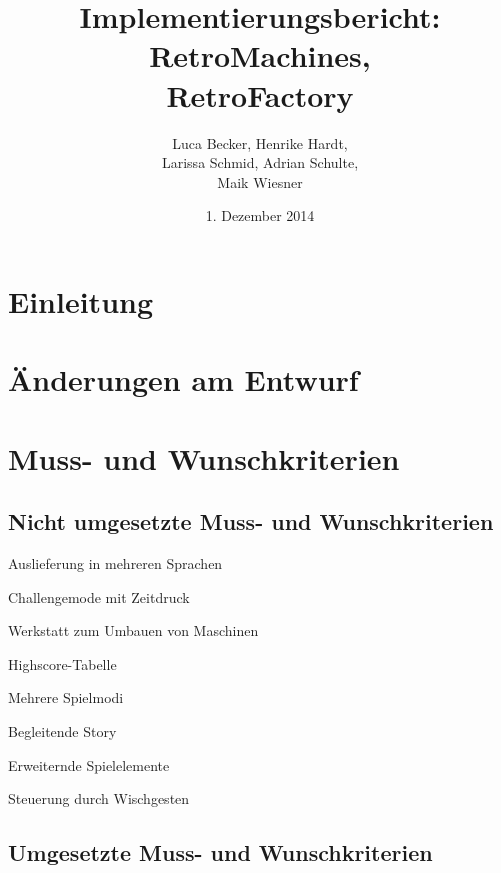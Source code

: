 \documentclass[parskip=full]{scrreprt}
\begin{document}
\title{Implementierungsbericht: RetroMachines, \\ RetroFactory}
\author{Luca Becker, Henrike Hardt,\\Larissa Schmid, Adrian Schulte,\\Maik Wiesner}
\date{1. Dezember 2014}
\maketitle
\thispagestyle{empty}

\clearpage

\thispagestyle{empty}
\tableofcontents
\thispagestyle{empty}

\clearpage
\setcounter{page}{1}

\chapter{Einleitung}

\chapter{Änderungen am Entwurf}

\chapter{Muss- und Wunschkriterien}

\section{Nicht umgesetzte Muss- und Wunschkriterien}

\begin{description}
	\item Auslieferung in mehreren Sprachen
	\item Challengemode mit Zeitdruck
	\item Werkstatt zum Umbauen von Maschinen
	\item Highscore-Tabelle
	\item Mehrere Spielmodi
	\item Begleitende Story
	\item Erweiternde Spielelemente
	\item Steuerung durch Wischgesten
\end{description}

\section{Umgesetzte Muss- und Wunschkriterien}
\end{document}
